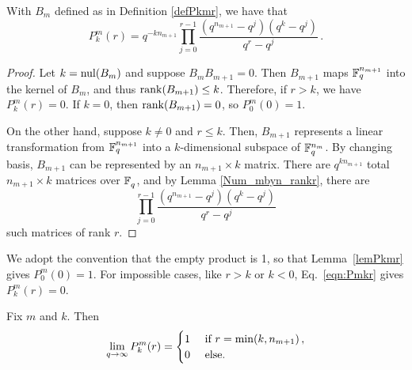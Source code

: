 
\begin{lemma}\label{lemPkmr} With $B_m$ defined as in Definition \ref{defPkmr}, we have that
  \begin{equation}
    P^m_k(r) = 
    q^{-kn_{m+1}}\prod_{j=0}^{r-1} \frac{(q^{n_{m+1}}-q^j) (q^k - q^j)}{q^r - q^j} \, . %
	 \label{eqn:Pmkr}
       \end{equation}
\end{lemma}
\begin{proof}
Let $k= \mathrm{nul}(B_{m})$ and suppose $B_mB_{m+1} = 0$.  Then $B_{m+1}$ maps
$\mathbb{F}_q^{n_{m+1}}$ into the kernel of $B_m$, and thus $\operatorname{\mathrm{rank}}(B_{m+1}) \leq k$.
Therefore, if $r>k$, we have $P^m_k(r) = 0$.  If $k=0$, then
$\operatorname{\mathrm{rank}}(B_{m+1}) = 0$, so $P^m_0(0) = 1$. 

On the other hand, suppose $k\neq 0$ and $r\leq k$.  Then, $B_{m+1}$ represents
a linear transformation from $\mathbb{F}_q^{n_{m+1}}$ into a $k$-dimensional subspace of
$\mathbb{F}_q^{n_{m}}$. By changing basis, $B_{m+1}$ can be represented by an
$n_{m+1} \times k$ matrix.  There are $q^{kn_{m+1}}$ total $n_{m+1} \times k$
matrices over $\mathbb{F}_q^{}$, and by
Lemma \ref{Num_mbyn_rankr}, there are 
\[
  \prod_{j=0}^{r-1} \frac{(q^{n_{m+1}}-q^j) ( q^k - q^j)}{q^r-q^j}
\]
such matrices of rank $r$.
\end{proof}

\begin{remark}
  We adopt the convention that the empty product is 1, so that Lemma~\ref{lemPkmr} gives $P^m_0(0) = 1$. 
  For impossible cases, like $r>k$ or $k<0$, Eq.~\eqref{eqn:Pmkr} gives $P^m_k(r) = 0$.
\end{remark}

\begin{lemma}
  \label{lem:Pqtoinfty}
  Fix $m$ and $k$. Then 
  \[
    \lim_{q \rightarrow \infty} P^m_k(r) = 
      \begin{cases}
        1 & \mbox{ if } r = \min(k,n_{m+1}) \, , \\
        0 & \mbox { else.}
      \end{cases}
    \]
\end{lemma}

